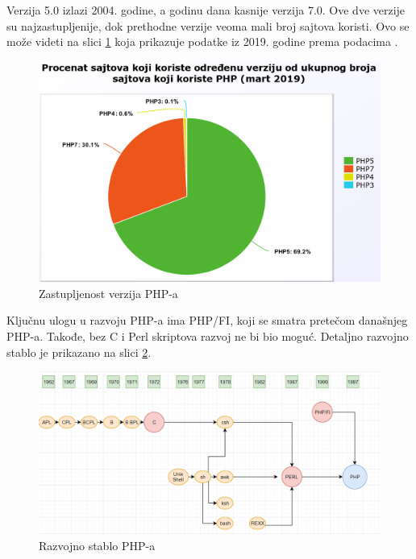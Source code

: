 \documentclass[a4paper]{article}
\begin{document}
{Verzija 5.0 izlazi 2004. godine, a godinu dana kasnije verzija 7.0. Ove dve verzije su najzastupljenije, dok prethodne verzije veoma mali broj sajtova koristi. Ovo se može videti na slici \ref{fig:proc_zastupljenosti} koja prikazuje podatke iz 2019. godine prema podacima \cite{stats}.

\begin{figure}[h!]
\begin{center}
\includegraphics[scale=0.25]{zastupljenost2019.png}
\end{center}
\label{fig:proc_zastupljenosti}
\caption{Zastupljenost verzija PHP-a}
\end{figure}

Ključnu ulogu u razvoju PHP-a ima PHP/FI, koji se smatra pretečom današnjeg PHP-a. Takođe, bez C i Perl skriptova razvoj ne bi bio moguć. Detaljno razvojno stablo je prikazano na slici \ref{fig:r_stablo}.


\begin{figure}[h!]
\begin{center}
\includegraphics[scale=0.45]{razvojno_stablo.png}
\end{center}
\label{fig:r_stablo}
\caption{Razvojno stablo PHP-a}
\end{figure}

}
\end{document}

